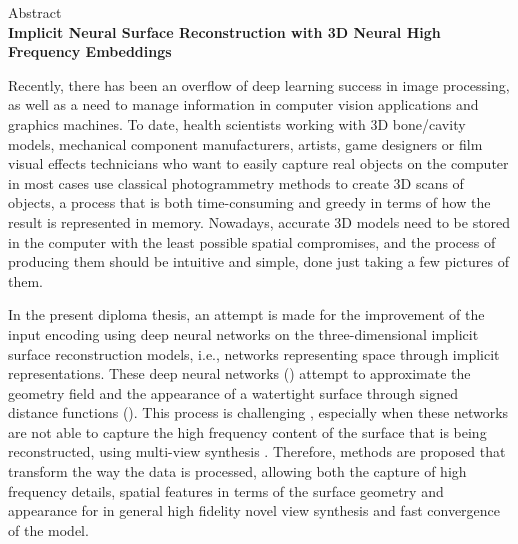 \clearpage
{}
\begin{center}
  \centering
  Abstract \\
  \vspace{0.5cm}
  \textbf{\large{ Implicit Neural Surface Reconstruction with 3D Neural High Frequency Embeddings}}
  \vspace{1cm}
\end{center}
\par

    Recently, there has been an overflow of deep learning success in image processing, as well as a need to manage  information in computer vision applications and graphics machines. To date, health scientists working with 3D bone/cavity models, mechanical component manufacturers, artists, game designers or film visual effects technicians who want to easily capture real objects on the computer in most cases use classical photogrammetry methods to create 3D scans of objects, a process that is both time-consuming and greedy in terms of how the result is represented in memory.
    Nowadays, accurate 3D models need to be stored in the computer with the least possible spatial compromises, and the process of producing them should be intuitive and simple, done just taking a few pictures of them.
\par
    In the present diploma thesis, an attempt is made for the improvement  of the input encoding using deep neural networks on the three-dimensional implicit surface reconstruction models, i.e.,  networks representing  space through implicit representations. These deep neural networks () attempt to approximate  the geometry field and the appearance of a watertight surface through signed distance functions (). This process is challenging , especially when these networks are not able to capture the high frequency content of the surface that is being reconstructed, using multi-view synthesis . Therefore, methods are proposed that transform the way the data is processed, allowing both the capture of high frequency details, spatial features in terms of the surface geometry and appearance for in general high fidelity novel view synthesis and fast convergence of the model.
\par
